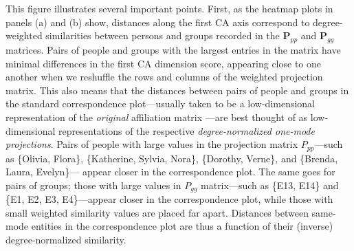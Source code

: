 \documentclass[a4paper,fleqn]{cas-sc}
\begin{document}
This figure illustrates several important points. First, as the heatmap plots in panels (a) and (b) show, distances along the first CA axis correspond to degree-weighted similarities between persons and groups recorded in the $\mathbf{P}_{pp}$ and $\mathbf{P}_{gg}$ matrices. Pairs of people and groups with the largest entries in the matrix have minimal differences in the first CA dimension score, appearing close to one another when we reshuffle the rows and columns of the weighted projection matrix. This also means that the distances between pairs of people and groups in the standard correspondence plot---usually taken to be a low-dimensional representation of the \textit{original} affiliation matrix \citep{borgatti1997network}---are best thought of as low-dimensional representations of the respective \textit{degree-normalized one-mode projections}. Pairs of people with large values in the projection matrix $P_{pp}$---such as \{Olivia, Flora\},  \{Katherine, Sylvia, Nora\}, \{Dorothy, Verne\}, and \{Brenda, Laura, Evelyn\}--- appear closer in the correspondence plot. The same goes for pairs of groups; those with large values in $P_{gg}$ matrix---such as \{E13, E14\} and \{E1, E2, E3, E4\}---appear closer in the correspondence plot, while those with small weighted similarity values are placed far apart. Distances between same-mode entities in the correspondence plot are thus a function of their (inverse) degree-normalized similarity.
\end{document}
